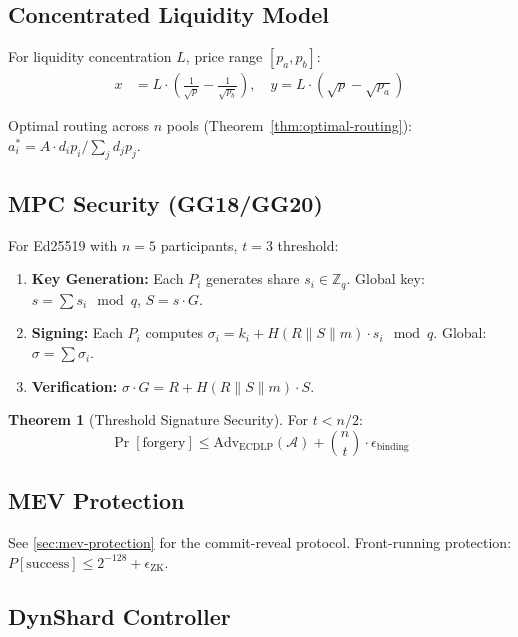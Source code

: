 \documentclass[12pt,a4paper]{article}
\theoremstyle{definition}
\newtheorem{theorem}{Theorem}[section]
\theoremstyle{remark}
\begin{document}
\subsection{Concentrated Liquidity Model}

For liquidity concentration $L$, price range $[p_a, p_b]$:
\begin{align}
x &= L \cdot \left(\frac{1}{\sqrt{p}} - \frac{1}{\sqrt{p_b}}\right), \quad y = L \cdot (\sqrt{p} - \sqrt{p_a})
\end{align}

Optimal routing across $n$ pools (Theorem~\ref{thm:optimal-routing}): $a_i^* = A \cdot d_i p_i / \sum_j d_j p_j$.

\subsection{MPC Security (GG18/GG20)}

For Ed25519 with $n = 5$ participants, $t = 3$ threshold:
\begin{enumerate}[nosep]
    \item \textbf{Key Generation:} Each $P_i$ generates share $s_i \in \mathbb{Z}_q$. Global key: $s = \sum s_i \mod q$, $S = s \cdot G$.
    \item \textbf{Signing:} Each $P_i$ computes $\sigma_i = k_i + H(R \| S \| m) \cdot s_i \mod q$. Global: $\sigma = \sum \sigma_i$.
    \item \textbf{Verification:} $\sigma \cdot G = R + H(R \| S \| m) \cdot S$.
\end{enumerate}

\begin{theorem}[Threshold Signature Security]
\label{thm:threshold-security}
For $t < n/2$:
\begin{equation}
\Pr[\text{forgery}] \leq \text{Adv}_{\text{ECDLP}}(\mathcal{A}) + \binom{n}{t} \cdot \epsilon_{\text{binding}}
\end{equation}
\end{theorem}

\subsection{MEV Protection}

See \cref{sec:mev-protection} for the commit-reveal protocol. Front-running protection: $P[\text{success}] \leq 2^{-128} + \epsilon_{\text{ZK}}$.

\subsection{DynShard Controller}
\end{document}
